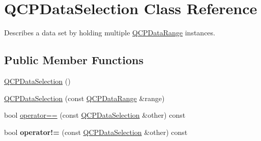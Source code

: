 \hypertarget{classQCPDataSelection}{}\section{Q\+C\+P\+Data\+Selection Class Reference}
\label{classQCPDataSelection}


Describes a data set by holding multiple \hyperlink{classQCPDataRange}{Q\+C\+P\+Data\+Range} instances.  


\subsection*{Public Member Functions}
\begin{DoxyCompactItemize}
\item 
\hyperlink{classQCPDataSelection_a0e0b7faaec7df1a7c77dd6f4883cdf0d}{Q\+C\+P\+Data\+Selection} ()
\item 
\hyperlink{classQCPDataSelection_a738dfb4f5718c5df5ed35ea33ac37818}{Q\+C\+P\+Data\+Selection} (const \hyperlink{classQCPDataRange}{Q\+C\+P\+Data\+Range} \&range)
\item 
bool \hyperlink{classQCPDataSelection_a2489ba93bca3f4f5dc5951eff7d84300}{operator==} (const \hyperlink{classQCPDataSelection}{Q\+C\+P\+Data\+Selection} \&other) const 
\item 
bool {\bfseries operator!=} (const \hyperlink{classQCPDataSelection}{Q\+C\+P\+Data\+Selection} \&other) const \hypertarget{classQCPDataSelection_afade4352fad85f165fa29797d5943330}{}\label{classQCPDataSelection_afade4352fad85f165fa29797d5943330}


\end{DoxyCompactItemize}
